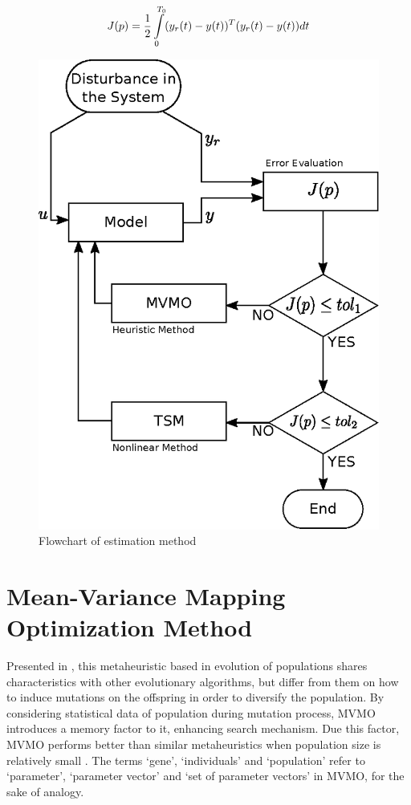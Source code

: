 \begin{equation}
	J(p) = \frac{1}{2}\int\displaylimits_{0}^{T_{0}}(y_{r}(t) - y(t))^{T}(y_{r}(t) - y(t))dt
	\label{eq: J(p)}
\end{equation}

\begin{figure}
	\caption{Flowchart of estimation method}
	\begin{center}
		\includegraphics[scale=0.7]{Images/Flowchart.eps}
	\end{center}
	\label{fig: flowchart}
\end{figure}

\section{Mean-Variance Mapping Optimization Method}

Presented in \cite{Erlich2010}, this metaheuristic based in evolution of populations shares characteristics with other evolutionary algorithms, but differ from them on how to induce mutations on the offspring in order to diversify the population. By considering statistical data of population during mutation process, MVMO introduces a memory factor to it, enhancing search mechanism. Due this factor, MVMO performs better than similar metaheuristics when population size is relatively small \cite{Nakawiro2011}. The terms `gene', `individuals' and `population' refer to `parameter', `parameter vector' and `set of parameter vectors' in MVMO, for the sake of analogy.


